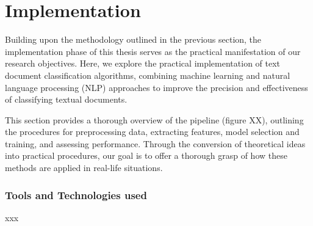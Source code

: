 \chapter{Implementation}


Building upon the methodology outlined in the previous section, the implementation phase of this thesis serves as the practical manifestation of our research objectives. Here, we explore the practical implementation of text document classification algorithms, combining machine learning and natural language processing (NLP) approaches to improve the precision and effectiveness of classifying textual documents.

This section provides a thorough overview of the pipeline (figure XX), outlining the procedures for preprocessing data, extracting features, model selection and training, and assessing performance. Through the conversion of theoretical ideas into practical procedures, our goal is to offer a thorough grasp of how these methods are applied in real-life situations.

\subsection{Tools and Technologies used}
xxx